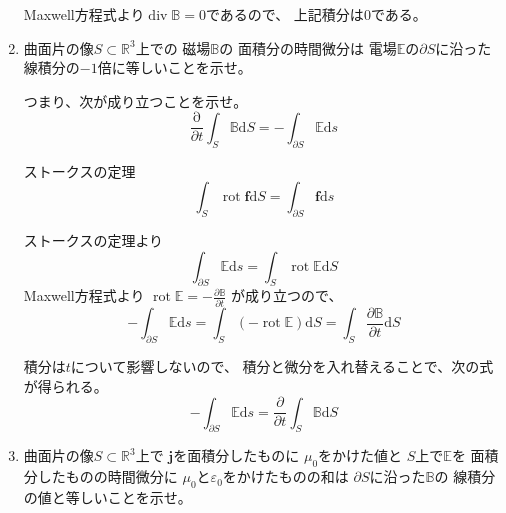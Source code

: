 \documentclass[12pt,b5paper]{ltjsarticle}
\DeclareMathOperator{\Rot}{rot}
\DeclareMathOperator{\Div}{div}
\begin{document}
\begin{enumerate}
      Maxwell方程式より$\Div\mathbb{B}=0$であるので、
      上記積分は$0$である。


      \hrulefill

 \item
      曲面片の像$S\subset \mathbb{R}^3$上での
      磁場$\mathbb{B}$の
      面積分の時間微分は
      電場$\mathbb{E}$の$\partial S$に沿った
      線積分の$-1$倍に等しいことを示せ。

      つまり、次が成り立つことを示せ。
      \begin{equation}
       \frac{\mathrm{\partial}}{\partial t}\int_{S} \mathbb{B}\mathrm{d}S
        = -\int_{\partial S} \mathbb{E}\mathrm{d}s
      \end{equation}

      \dotfill

      ストークスの定理
      \begin{equation}
       \int_{S}\Rot \bm{f} \mathrm{d}S
        = \int_{\partial S} \bm{f} \mathrm{d}s
      \end{equation}

      \dotfill

      ストークスの定理より
      \begin{equation}
       \int_{\partial S} \mathbb{E}\mathrm{d}s
        = \int_{S} \Rot\mathbb{E}\mathrm{d}S
      \end{equation}
      Maxwell方程式より
      $\Rot\mathbb{E}=-\frac{\partial \mathbb{B}}{\partial t}$
      が成り立つので、
      \begin{equation}
       -\int_{\partial S} \mathbb{E}\mathrm{d}s
        = \int_{S} (-\Rot\mathbb{E})\mathrm{d}S
        = \int_{S} \frac{\partial \mathbb{B}}{\partial t}\mathrm{d}S
      \end{equation}

      積分は$t$について影響しないので、
      積分と微分を入れ替えることで、次の式が得られる。
      \begin{equation}
       -\int_{\partial S} \mathbb{E}\mathrm{d}s
        =\frac{\partial}{\partial t}
        \int_{S} \mathbb{B}\mathrm{d}S
      \end{equation}


      \hrulefill

 \item
      曲面片の像$S\subset \mathbb{R}^3$上で
      $\bm{j}$を面積分したものに
      $\mu_0$をかけた値と
      $S$上で$\mathbb{E}$を
      面積分したものの時間微分に
      $\mu_0$と$\varepsilon_0$をかけたものの和は
      $\partial S$に沿った$\mathbb{B}$の
      線積分の値と等しいことを示せ。


\end{enumerate}
\end{document}
